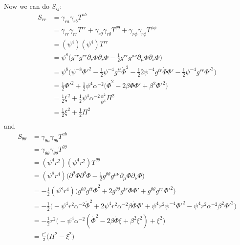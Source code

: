 \documentclass[12pt]{article}
\numberwithin{equation}{section}
\begin{document}
Now we can do $S_{ij}$:
\begin{equation}
\begin{aligned}
S_{rr} &= \gamma_{ra} \gamma_{rb} T^{ab} \\
&= \gamma_{rr} \gamma_{rr} T^{rr} + \gamma_{r \theta} \gamma_{r\theta} T^{\theta \theta} + \gamma_{r\phi} \gamma_{r\phi} T^{\phi \phi} \\
&= (\psi^4) (\psi^4) T^{rr} \\
&= \psi^8 \Big( g^{rr} g^{rr} \partial_r \Phi \partial_r \Phi - \frac{1}{2} g^{r r} g^{\mu \nu} \partial_\mu \Phi \partial_\nu \Phi \Big) \\
&= \psi^8 \Big( \psi^{-8} \Phi'^2 - \frac{1}{2} \psi^{-4} g^{t t} \dot{\Phi}^2 - \frac{1}{2} 2 \psi^{-4} g^{t r} \dot{\Phi} \Phi' - \frac{1}{2} \psi^{-4} g^{r r} \Phi'^2 \Big) \\
&= \frac{1}{2} \Phi'^2 + \frac{1}{2} \psi^4 \alpha^{-2} \Big( \dot{\Phi}^2 - 2 \beta \dot{\Phi} \Phi' + \beta^2 \Phi'^2 \Big) \\
&= \frac{1}{2} \xi^2 + \frac{1}{2} \psi^4 \alpha^{-2} \frac{\alpha^2}{\psi^4} \Pi^2 \\
&= \frac{1}{2} \xi^2 + \frac{1}{2} \Pi^2 \\
\end{aligned}
\end{equation}
and
\begin{equation}
\begin{aligned}
S_{\theta \theta} &= \gamma_{\theta a} \gamma_{\theta b} T^{ab} \\
&= \gamma_{\theta \theta} \gamma_{\theta \theta} T^{\theta \theta} \\
&= (\psi^4 r^2) (\psi^4 r^2) T^{\theta \theta} \\
&= (\psi^8 r^4) \Big( \partial^\theta \Phi \partial^\theta \Phi - \frac{1}{2} g^{\theta \theta} g^{\mu \nu} \partial_\mu \Phi \partial_\nu \Phi  \Big) \\
&= - \frac{1}{2} (\psi^8 r^4) \Big( g^{\theta \theta} g^{t t} \dot{\Phi}^2 + 2 g^{\theta \theta} g^{t r} \dot{\Phi} \Phi' + g^{\theta \theta} g^{r r} \Phi'^2  \Big) \\
&= - \frac{1}{2} \Big( - \psi^4 r^2 \alpha^{-2} \dot{\Phi}^2 + 2 \psi^4 r^2 \alpha^{-2} \beta \dot{\Phi} \Phi' + \psi^4 r^2 \psi^{-4} \Phi'^2 - \psi^4 r^2 \alpha^{-2} \beta^2 \Phi'^2 \Big) \\
&= - \frac{1}{2} r^2 \Big( - \psi^4 \alpha^{-2} (\dot{\Phi}^2 - 2 \beta \dot{\Phi} \xi + \beta^2 \xi^2) + \xi^2 \Big) \\
&= \frac{r^2}{2} \Big( \Pi^2 - \xi^2 \Big) \\
\end{aligned}
\end{equation}
\end{document}
